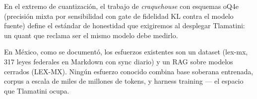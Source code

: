 En el extremo de cuantización, el trabajo de \emph{craquehouse} con esquemas oQ4e (precisión mixta por sensibilidad con gate de fidelidad KL contra el modelo fuente) define el estándar de honestidad que exigiremos al desplegar Tlamatini: un quant que reclama ser el mismo modelo debe medirlo.

En México, como se documentó, los esfuerzos existentes son un dataset (lex-mx, 317 leyes federales en Markdown con sync diario) y un RAG sobre modelos cerrados (LEX-MX). Ningún esfuerzo conocido combina base soberana entrenada, corpus a escala de miles de millones de tokens, y harness training --- el espacio que Tlamatini ocupa.
